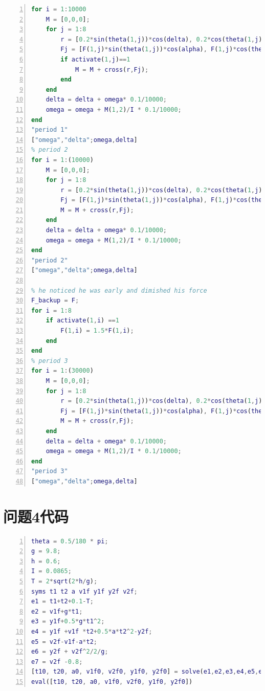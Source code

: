 \documentclass[nocover]{cumcmart}%
\begin{document}
\begin{appendix}
\begin{lstlisting}[language=Matlab,numbers=left, numberstyle=\tiny,keywordstyle=\color{blue!70},commentstyle=\color{red!50!green!50!blue!50},frame=shadowbox, rulesepcolor=\color{red!20!green!20!blue!20}]
% period 1
for i = 1:10000
    M = [0,0,0];
    for j = 1:8
        r = [0.2*sin(theta(1,j))*cos(delta), 0.2*cos(theta(1,j)),-0.2*sin(theta(1,j))*sin(delta)];
        Fj = [F(1,j)*sin(theta(1,j))*cos(alpha), F(1,j)*cos(theta(1,j))*cos(alpha), F(1,j)*sin(alpha)];
        if activate(1,j)==1
            M = M + cross(r,Fj);   
        end
    end
    delta = delta + omega* 0.1/10000;
    omega = omega + M(1,2)/I * 0.1/10000;
end
"period 1"
["omega","delta";omega,delta]
% period 2
for i = 1:(10000)
    M = [0,0,0];
    for j = 1:8
        r = [0.2*sin(theta(1,j))*cos(delta), 0.2*cos(theta(1,j)),-0.2*sin(theta(1,j))*sin(delta)];
        Fj = [F(1,j)*sin(theta(1,j))*cos(alpha), F(1,j)*cos(theta(1,j))*cos(alpha), F(1,j)*sin(alpha)];
        M = M + cross(r,Fj); 
    end
    delta = delta + omega* 0.1/10000;
    omega = omega + M(1,2)/I * 0.1/10000;
end
"period 2"
["omega","delta";omega,delta]

% he noticed he was early and dimished his force
F_backup = F;
for i = 1:8
    if activate(1,i) ==1
        F(1,i) = 1.5*F(1,i);
    end
end
% period 3
for i = 1:(30000)
    M = [0,0,0];
    for j = 1:8
        r = [0.2*sin(theta(1,j))*cos(delta), 0.2*cos(theta(1,j)),-0.2*sin(theta(1,j))*sin(delta)];
        Fj = [F(1,j)*sin(theta(1,j))*cos(alpha), F(1,j)*cos(theta(1,j))*cos(alpha), F(1,j)*sin(alpha)];
        M = M + cross(r,Fj); 
    end
    delta = delta + omega* 0.1/10000;
    omega = omega + M(1,2)/I * 0.1/10000;
end
"period 3"
["omega","delta";omega,delta]
\end{lstlisting}


\section{问题4代码}
\lstset{breaklines}
\begin{lstlisting}[language=Matlab,numbers=left, numberstyle=\tiny,keywordstyle=\color{blue!70},commentstyle=\color{red!50!green!50!blue!50},frame=shadowbox, rulesepcolor=\color{red!20!green!20!blue!20}] 
theta = 0.5/180 * pi;
g = 9.8;
h = 0.6;
I = 0.0865;
T = 2*sqrt(2*h/g);
syms t1 t2 a v1f y1f y2f v2f;
e1 = t1+t2+0.1-T;
e2 = v1f+g*t1;
e3 = y1f+0.5*g*t1^2;
e4 = y1f +v1f *t2+0.5*a*t2^2-y2f;
e5 = v2f-v1f-a*t2;
e6 = y2f + v2f^2/2/g;
e7 = v2f -0.8;
[t10, t20, a0, v1f0, v2f0, y1f0, y2f0] = solve(e1,e2,e3,e4,e5,e6,e7,t1, t2, a, v1f, v2f, y1f, y2f);
eval([t10, t20, a0, v1f0, v2f0, y1f0, y2f0])
\end{lstlisting}


\end{appendix}
\end{document}
